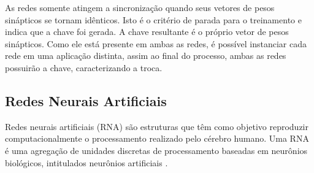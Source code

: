 \documentclass[12pt]{article}
\begin{document}
            
            As redes somente atingem a sincronização quando seus vetores de pesos sinápticos se tornam idênticos. Isto é o critério de parada para o treinamento e indica que a chave foi gerada. A chave resultante é o próprio vetor de pesos sinápticos. Como ele está presente em ambas as redes, é possível instanciar cada rede em uma aplicação distinta, assim ao final do processo, ambas as redes possuirão a chave, caracterizando a troca.
            
        \subsection{Redes Neurais Artificiais}
        \label{subsec:redes_neurais}
        
            Redes neurais artificiais (RNA) são estruturas que têm como objetivo reproduzir computacionalmente o processamento realizado pelo cérebro humano. Uma RNA é uma agregação de unidades discretas de processamento baseadas em neurônios biológicos, intitulados neurônios artificiais \cite{aragao2018antispam}.
            
            
            
            
\end{document}
